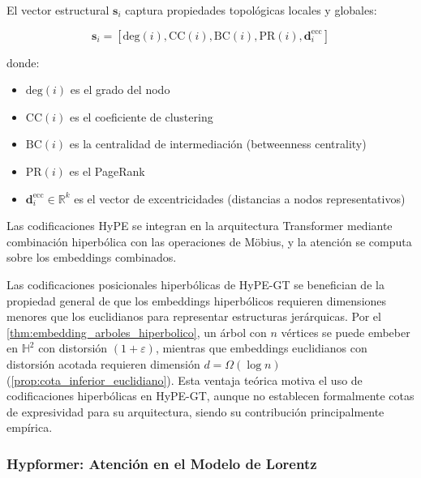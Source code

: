 \begin{definition}\label{def:structural_vector}
El vector estructural $\mathbf{s}_i$ captura propiedades topológicas locales y globales:

\begin{equation}
\mathbf{s}_i = [\text{deg}(i), \text{CC}(i), \text{BC}(i), \text{PR}(i), \mathbf{d}_i^{\text{ecc}}]
\end{equation}

donde:
\begin{itemize}
    \item $\text{deg}(i)$ es el grado del nodo
    \item $\text{CC}(i)$ es el coeficiente de clustering
    \item $\text{BC}(i)$ es la centralidad de intermediación (betweenness centrality)
    \item $\text{PR}(i)$ es el PageRank
    \item $\mathbf{d}_i^{\text{ecc}} \in \mathbb{R}^k$ es el vector de excentricidades (distancias a nodos representativos)
\end{itemize}
\end{definition}

Las codificaciones HyPE se integran en la arquitectura \gls{Transformer} mediante combinación hiperbólica con las operaciones de Möbius, y la atención se computa sobre los embeddings combinados.

\begin{remark}\label{rem:hypegt_expressiveness}
Las codificaciones posicionales hiperbólicas de HyPE-GT \citep{hypegt2023} se benefician de la propiedad general de que los embeddings hiperbólicos requieren dimensiones menores que los euclidianos para representar estructuras jerárquicas. Por el \autoref{thm:embedding_arboles_hiperbolico}, un árbol con $n$ vértices se puede embeber en $\mathbb{H}^2$ con distorsión $(1+\varepsilon)$, mientras que embeddings euclidianos con distorsión acotada requieren dimensión $d = \Omega(\log n)$ (\autoref{prop:cota_inferior_euclidiano}). Esta ventaja teórica motiva el uso de codificaciones hiperbólicas en HyPE-GT, aunque \citet{hypegt2023} no establecen formalmente cotas de expresividad para su arquitectura, siendo su contribución principalmente empírica.
\end{remark}


\subsubsection{Hypformer: Atención en el Modelo de Lorentz}\label{subsubsec:hypformer_lorentz}

